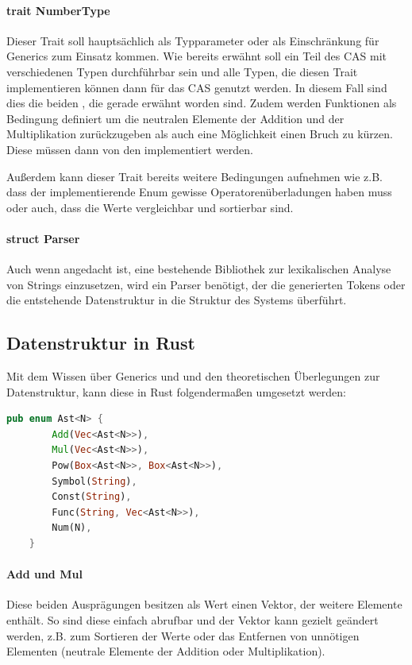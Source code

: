 \documentclass[11pt,a4paper, ngerman]{article}
\begin{document}
\paragraph{trait NumberType} Dieser Trait soll hauptsächlich als Typparameter oder als Einschränkung für Generics zum Einsatz kommen. Wie bereits erwähnt soll ein Teil des CAS mit verschiedenen Typen durchführbar sein und alle Typen, die diesen Trait implementieren können dann für das CAS genutzt werden. In diesem Fall sind dies die beiden , die gerade erwähnt worden sind. Zudem werden Funktionen als Bedingung definiert um die neutralen Elemente der Addition und der Multiplikation zurückzugeben als auch eine Möglichkeit einen Bruch zu kürzen. Diese müssen dann von den  implementiert werden.

Außerdem kann dieser Trait bereits weitere Bedingungen aufnehmen wie z.B. dass der implementierende Enum gewisse Operatorenüberladungen haben muss oder auch, dass die Werte vergleichbar und sortierbar sind.

\paragraph{struct Parser} Auch wenn angedacht ist, eine bestehende Bibliothek zur lexikalischen Analyse von Strings einzusetzen, wird ein Parser benötigt, der die generierten Tokens oder die entstehende Datenstruktur in die Struktur des Systems überführt.

\subsection{Datenstruktur in Rust}
Mit dem Wissen über Generics und und den theoretischen Überlegungen zur Datenstruktur, kann diese in Rust folgendermaßen umgesetzt werden:
\begin{lstlisting}[language=rust, caption={Datenstruktur in Rust}]
    pub enum Ast<N> {
        Add(Vec<Ast<N>>),
        Mul(Vec<Ast<N>>),
        Pow(Box<Ast<N>>, Box<Ast<N>>),
        Symbol(String),
        Const(String),
        Func(String, Vec<Ast<N>>),
        Num(N),
    }
\end{lstlisting}

\paragraph{Add und Mul} Diese beiden Ausprägungen besitzen als Wert einen Vektor, der weitere Elemente enthält. So sind diese einfach abrufbar und der Vektor kann gezielt geändert werden, z.B. zum Sortieren der Werte oder das Entfernen von unnötigen Elementen (neutrale Elemente der Addition oder Multiplikation).
\end{document}
